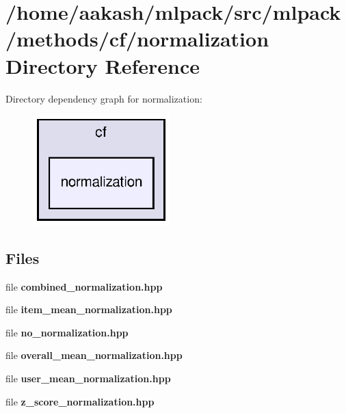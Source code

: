 \section{/home/aakash/mlpack/src/mlpack/methods/cf/normalization Directory Reference}
\label{dir_0305265e5f4644324021687d59cb9a93}
Directory dependency graph for normalization\+:
\nopagebreak
\begin{figure}[H]
\begin{center}
\leavevmode
\includegraphics[width=150pt]{dir_0305265e5f4644324021687d59cb9a93_dep}
\end{center}
\end{figure}
\subsection*{Files}
\begin{DoxyCompactItemize}
\item 
file \textbf{ combined\+\_\+normalization.\+hpp}
\item 
file \textbf{ item\+\_\+mean\+\_\+normalization.\+hpp}
\item 
file \textbf{ no\+\_\+normalization.\+hpp}
\item 
file \textbf{ overall\+\_\+mean\+\_\+normalization.\+hpp}
\item 
file \textbf{ user\+\_\+mean\+\_\+normalization.\+hpp}
\item 
file \textbf{ z\+\_\+score\+\_\+normalization.\+hpp}
\end{DoxyCompactItemize}
